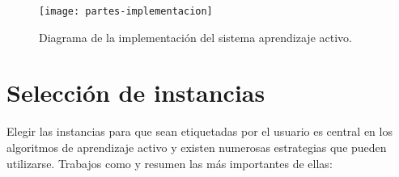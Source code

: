 \begin{figure}[h!]\label{aa-con-secciones}
\centering
\texttt{[image: partes-implementacion]}
\caption{Diagrama de la implementación del sistema aprendizaje activo.}\label{aa-con-secciones}
\end{figure}

\section{Selección de instancias}

Elegir las instancias para que sean etiquetadas por el usuario es central en los algoritmos de aprendizaje activo y existen numerosas estrategias que pueden utilizarse. Trabajos como \citet{settles_active_learning_survey} y \citet{al-logistic-regresion-schein} resumen las más importantes de ellas:

